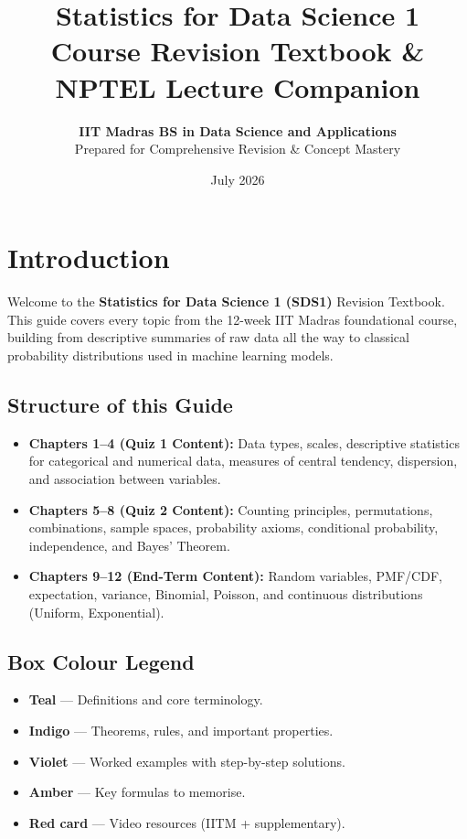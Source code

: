 \documentclass[11pt,a4paper,oneside]{book}
\title{
    \Huge\bfseries\sffamily\color{primarydark} Statistics for Data Science 1 \\
    \large\vspace{0.3cm}\color{tealdef} Course Revision Textbook \& NPTEL Lecture Companion
}
\author{
    \textbf{IIT Madras BS in Data Science and Applications} \\
    \small Prepared for Comprehensive Revision \& Concept Mastery
}
\date{July 2026}
\begin{document}
\maketitle

\frontmatter
\tableofcontents
\newpage

\chapter*{Introduction}

Welcome to the \textbf{Statistics for Data Science 1 (SDS1)} Revision Textbook. This guide covers every topic from the 12-week IIT Madras foundational course, building from descriptive summaries of raw data all the way to classical probability distributions used in machine learning models.

\section*{Structure of this Guide}
\begin{itemize}
    \item \textbf{Chapters 1--4 (Quiz 1 Content):} Data types, scales, descriptive statistics for categorical and numerical data, measures of central tendency, dispersion, and association between variables.
    \item \textbf{Chapters 5--8 (Quiz 2 Content):} Counting principles, permutations, combinations, sample spaces, probability axioms, conditional probability, independence, and Bayes' Theorem.
    \item \textbf{Chapters 9--12 (End-Term Content):} Random variables, PMF/CDF, expectation, variance, Binomial, Poisson, and continuous distributions (Uniform, Exponential).
\end{itemize}

\section*{Box Colour Legend}
\begin{itemize}
    \item \textcolor{tealdef}{\textbf{Teal}} --- Definitions and core terminology.
    \item \textcolor{primaryborder}{\textbf{Indigo}} --- Theorems, rules, and important properties.
    \item \textcolor{purpleex}{\textbf{Violet}} --- Worked examples with step-by-step solutions.
    \item \textcolor{coralformula}{\textbf{Amber}} --- Key formulas to memorise.
    \item \textcolor{yttext}{\textbf{Red card}} --- Video resources (IITM + supplementary).
\end{itemize}


\mainmatter














\backmatter
\printindex

\end{document}
